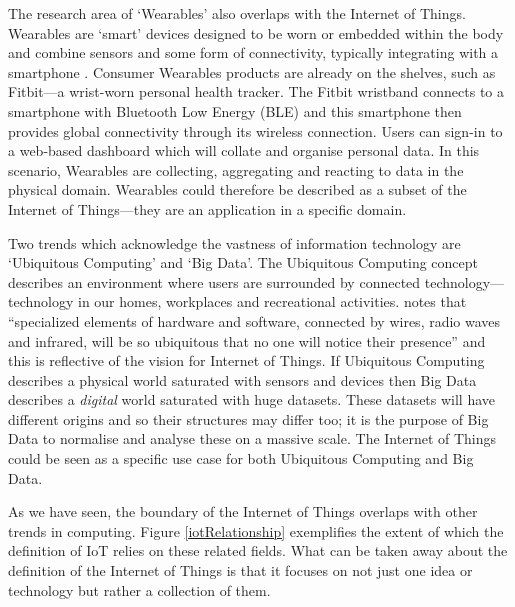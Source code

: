       The research area of `Wearables' also overlaps with the Internet of Things. Wearables are `smart' devices designed to be worn or embedded within the body and combine sensors and some form of connectivity, typically integrating with a smartphone \citep{6844949, evrything}. Consumer Wearables products are already on the shelves, such as Fitbit---a wrist-worn personal health tracker. The Fitbit wristband connects to a smartphone with Bluetooth Low Energy (BLE) and this smartphone then provides global connectivity through its wireless connection. Users can sign-in to a web-based dashboard which will collate and organise personal data. In this scenario, Wearables are collecting, aggregating and reacting to data in the physical domain. Wearables could therefore be described as a subset of the Internet of Things---they are an application in a specific domain.

      Two trends which acknowledge the vastness of information technology are `Ubiquitous Computing' and `Big Data'. The Ubiquitous Computing concept describes an environment where users are surrounded by connected technology---technology in our homes, workplaces and recreational activities. \cite{Weiser:1999} notes that ``specialized elements of hardware and software, connected by wires, radio waves and infrared, will be so ubiquitous that no one will notice their presence'' and this is reflective of the vision for Internet of Things. If Ubiquitous Computing describes a physical world saturated with sensors and devices then Big Data describes a \emph{digital} world saturated with huge datasets. These datasets will have different origins and so their structures may differ too; it is the purpose of Big Data to normalise and analyse these on a massive scale. The Internet of Things could be seen as a specific use case for both Ubiquitous Computing and Big Data.

      As we have seen, the boundary of the Internet of Things overlaps with other trends in computing. Figure \ref{iotRelationship} exemplifies the extent of which the definition of IoT relies on these related fields. What can be taken away about the definition of the Internet of Things is that it focuses on not just one idea or technology but rather a collection of them.


